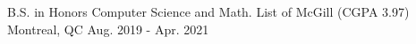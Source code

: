 

\begin{cventries}

  \cventry
  {B.S. in Honors Computer Science and Math. List of } %
  {McGill (CGPA 3.97)} %
    {Montreal, QC} %
    {Aug. 2019 - Apr. 2021} %
    {
    }

\end{cventries}

